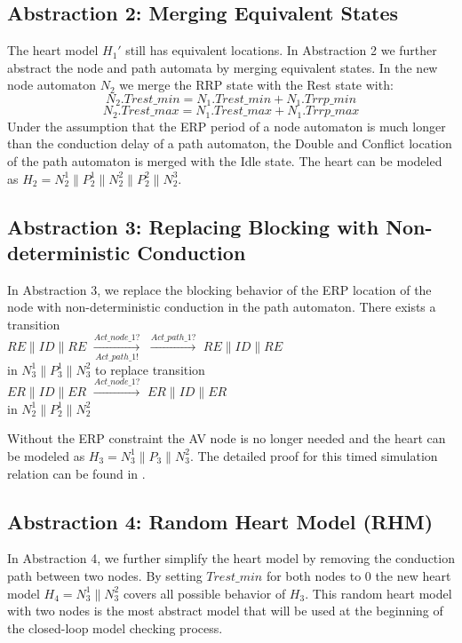 \subsection{Abstraction 2: Merging Equivalent States}
The heart model $H_1'$ still has equivalent locations. In Abstraction 2 we further abstract the node and path automata by merging equivalent states. In the new node automaton $N_2$ we merge the \textsf{RRP} state with the \textsf{Rest} state with:
$$N_2.Trest\_min = N_1.Trest\_min+N_1.Trrp\_min$$
$$N_2.Trest\_max = N_1.Trest\_max+N_1.Trrp\_max$$
Under the assumption that the ERP period of a node automaton is much longer than the conduction delay of a path automaton,  the \textsf{Double} and \textsf{Conflict} location of the path automaton is merged with the \textsf{Idle} state. The heart can be modeled as $H_2=N_2^1\| P_2^1\| N_2^2\| P_2^2\| N_2^3$.

\subsection{Abstraction 3: Replacing Blocking with Non-deterministic Conduction}
In Abstraction 3, we replace the blocking behavior of the \textsf{ERP} location of the node with non-deterministic conduction in the path automaton. There exists a transition\\ 
$RE\| ID\| RE$ 
$\xrightarrow[Act\_path\_1!]{Act\_node\_1?}$ 
$\xrightarrow{Act\_path\_1?}$ 
$RE\| ID\| RE$\\
in $N_3^1\| P_3^1\| N_3^2$ to replace transition\\
$ER\| ID\| ER$ 
$\xrightarrow{Act\_node\_1?}$ 
$ER\| ID\| ER$\\
in $N_2^1\| P_2^1\| N_2^2$

Without the ERP constraint the AV node is no longer needed and the heart can be modeled as $H_3=N_3^1\| P_3\| N_3^2$.  The detailed proof for this timed simulation relation can be found in \cite{STTT13}. 
\subsection{Abstraction 4: Random Heart Model (RHM)}
In Abstraction 4, we further simplify the heart model by removing the conduction path between two nodes. By setting $Trest\_min$ for both nodes to 0 the new heart model $H_4=N_3^1\|N_3^2$ covers all possible behavior of $H_3$. This random heart model with two nodes is the most abstract model that will be used at the beginning of the closed-loop model checking process.

